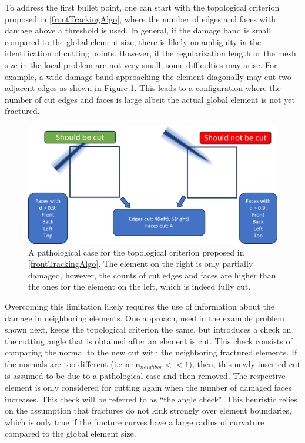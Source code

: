 To address the first bullet point, one can start with the topological criterion proposed in \ref{frontTrackingAlgo}, where the number of edges and faces with damage above a threshold is used. In general, if the damage band is small compared to the global element size, there is likely no ambiguity in the identification of cutting points. However, if the regularization length or the mesh size in the local problem are not very small, some difficulties may arise. For example, a wide damage band approaching the element diagonally may cut two adjacent edges as shown in Figure \ref{fig:pathological_case}. This leads to a configuration where the number of cut edges and faces is large albeit the actual global element is not yet fractured. 

\begin{figure}
    \centering
    \includegraphics[width=\linewidth]{Chapter4/figures/nonplanar/pathology.png}
    \caption{A pathological case for the topological criterion proposed in \ref{frontTrackingAlgo}. The element on the right is only partially damaged, however, the counts of cut edges and faces are higher than the ones for the element on the left, which is indeed fully cut.}
    \label{fig:pathological_case}
\end{figure}%

Overcoming this limitation likely requires the use of information about the damage in neighboring elements. One approach, used in the example problem shown next, keeps the topological criterion the same, but introduces a check on the cutting angle that is obtained after an element is cut. This check consists of comparing the normal to the new cut with the neighboring fractured elements. If the normals are too different (i.e $\textbf{n}\cdot\textbf{n}_{neighbor} << 1$), then, this newly inserted cut is assumed to be due to a pathological case and then removed. The respective element is only considered for cutting again when the number of damaged faces increases. This check will be referred to as ``the angle check".
This heuristic relies on the assumption that fractures do not kink strongly over element boundaries, which is only true if the fracture curves have a large radius of curvature compared to the global element size. 

